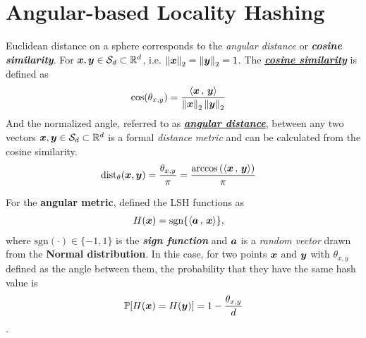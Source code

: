 \documentclass[11pt]{article}
\begin{document}

\section{Angular-based Locality Hashing}
Euclidean distance on a sphere corresponds to the \emph{angular distance} or \emph{\textbf{cosine similarity}}. For $\boldsymbol{x}, \boldsymbol{y} \in {\mathcal S}_{d} \subset {\mathbb R}^{d}$, i.e. $\left\|\boldsymbol{x}\right\|_{2} = \left\|\boldsymbol{y}\right\|_{2} = 1$. The  \underline{\emph{\textbf{cosine similarity}}} is defined as
\begin{align}
\cos(\theta_{x,y}) &= \frac{\left\langle \boldsymbol{x}\,,\, \boldsymbol{y} \right\rangle}{\left\|\boldsymbol{x}\right\|_{2}  \left\|\boldsymbol{y}\right\|_{2} } \label{eqn: cos_sim}
\end{align} And the normalized angle, referred to as \underline{\emph{\textbf{angular distance}}}, between any two vectors $\boldsymbol{x}, \boldsymbol{y} \in {\mathcal S}_{d} \subset {\mathbb R}^{d}$ is a formal \emph{distance} \emph{metric} and can be calculated from the cosine similarity.
\begin{align}
\text{dist}_{\theta}(\boldsymbol{x}, \boldsymbol{y}) &= \frac{\theta_{x,y}}{\pi} = \frac{\arccos\left(\left\langle \boldsymbol{x}\,,\, \boldsymbol{y} \right\rangle\right)}{\pi}
\end{align}

For the \textbf{angular metric}, \citep{chavez2001searching} defined the LSH functions as 
\begin{align}
H(\boldsymbol{x}) &= \text{sgn}\{\left\langle \boldsymbol{a}\,,\, \boldsymbol{x} \right\rangle\}, \label{eqn: lsh_angular}
\end{align} where $\text{sgn}(\cdot) \in \{-1, 1\}$ is the \emph{\textbf{sign function}} and $\boldsymbol{a}$ is a \emph{random vector} drawn from the \textbf{Normal distribution}. In this case, for two points $\boldsymbol{x}$ and $\boldsymbol{y}$ with $\theta_{x,y}$ defined as the angle between them, the probability that they have the same hash value is $${\mathbb P}[H(\boldsymbol{x}) = H(\boldsymbol{y})] = 1 - \frac{\theta_{x,y}}{d}$$.
\end{document}

